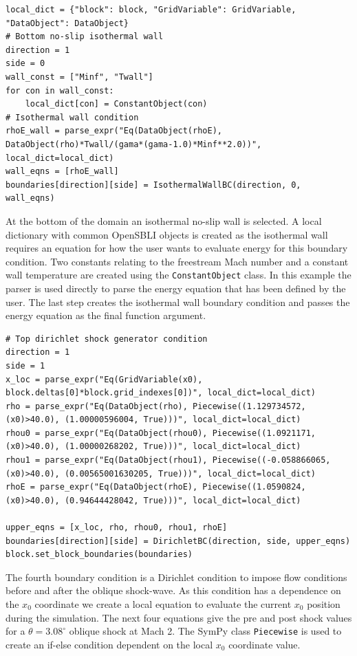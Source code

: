 \documentclass[11pt]{article}
\begin{document}
\begin{lstlisting}
local_dict = {"block": block, "GridVariable": GridVariable, "DataObject": DataObject}
# Bottom no-slip isothermal wall
direction = 1
side = 0
wall_const = ["Minf", "Twall"]
for con in wall_const:
    local_dict[con] = ConstantObject(con)
# Isothermal wall condition
rhoE_wall = parse_expr("Eq(DataObject(rhoE), DataObject(rho)*Twall/(gama*(gama-1.0)*Minf**2.0))", local_dict=local_dict)
wall_eqns = [rhoE_wall]
boundaries[direction][side] = IsothermalWallBC(direction, 0, wall_eqns)
\end{lstlisting}
At the bottom of the domain an isothermal no-slip wall is selected. A local dictionary with common OpenSBLI objects is created as the isothermal wall requires an equation for how the user wants to evaluate energy for this boundary condition. Two constants relating to the freestream Mach number and a constant wall temperature are created using the \verb|ConstantObject| class. In this example the parser is used directly to parse the energy equation that has been defined by the user. The last step creates the isothermal wall boundary condition and passes the energy equation as the final function argument.


\begin{lstlisting}
# Top dirichlet shock generator condition
direction = 1
side = 1
x_loc = parse_expr("Eq(GridVariable(x0), block.deltas[0]*block.grid_indexes[0])", local_dict=local_dict)
rho = parse_expr("Eq(DataObject(rho), Piecewise((1.129734572, (x0)>40.0), (1.00000596004, True)))", local_dict=local_dict)
rhou0 = parse_expr("Eq(DataObject(rhou0), Piecewise((1.0921171, (x0)>40.0), (1.00000268202, True)))", local_dict=local_dict)
rhou1 = parse_expr("Eq(DataObject(rhou1), Piecewise((-0.058866065, (x0)>40.0), (0.00565001630205, True)))", local_dict=local_dict)
rhoE = parse_expr("Eq(DataObject(rhoE), Piecewise((1.0590824, (x0)>40.0), (0.94644428042, True)))", local_dict=local_dict)

upper_eqns = [x_loc, rho, rhou0, rhou1, rhoE]
boundaries[direction][side] = DirichletBC(direction, side, upper_eqns)
block.set_block_boundaries(boundaries)
\end{lstlisting}
The fourth boundary condition is a Dirichlet condition to impose flow conditions before and after the oblique shock-wave. As this condition has a dependence on the $x_0$ coordinate we create a local equation to evaluate the current $x_0$ position during the simulation. The next four equations give the pre and post shock values for a $\theta=3.08^{\circ}$ oblique shock at Mach 2. The SymPy class \verb|Piecewise| is used to create an if-else condition dependent on the local $x_0$ coordinate value. 
\end{document}
